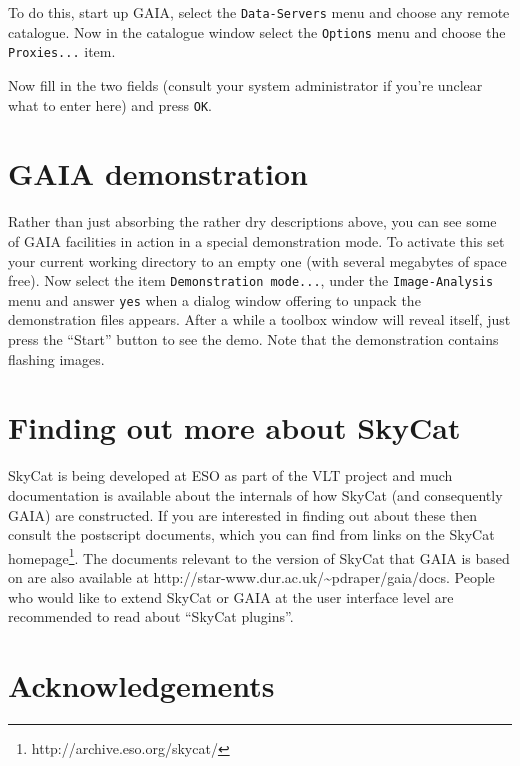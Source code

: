 \documentclass[twoside,11pt]{article}
\newcommand{\htmladdnormallinkfoot}[2]{#1\footnote{#2}}
\newcommand{\htmladdnormallink}[2]{#1}
\newcommand{\xlabel}[1]{}
\renewcommand{\_}{\texttt{\symbol{95}}}
\newcommand{\mytt}[1]{{\texttt{#1}}}
\begin{document}
To do this, start up GAIA, select the \mytt{Data-Servers} menu and
choose any remote catalogue. Now in the catalogue window select the
\mytt{Options} menu and choose the \mytt{Proxies...} item.

Now fill in the two fields (consult your system administrator if you're
unclear what to enter here) and press \mytt{OK}.

\section{\xlabel{gaia_demonstration}GAIA demonstration}
Rather than just absorbing the rather dry descriptions above, you can
see some of GAIA facilities in action in a special demonstration
mode. To activate this set your current working directory to an empty
one (with several megabytes of space free). Now select the item
\mytt{Demonstration mode...}, under the \mytt{Image-Analysis} menu and
answer \mytt{yes} when a dialog window offering to unpack the
demonstration files appears. After a while a toolbox window will
reveal itself, just press the ``Start'' button to see the demo. Note
that the demonstration contains flashing images.

\section{\xlabel{finding_out_more_about_skycat}Finding out more about SkyCat}
\htmladdnormallink{SkyCat}{http://archive.eso.org/skycat/} is being
developed at \htmladdnormallink{ESO}{http://www.eso.org/} as part of
the \htmladdnormallink{VLT}{http://www.eso.org/vlt/} project and much
documentation is available about the internals of how SkyCat (and
consequently GAIA) are constructed. If you are interested in finding
out about these then consult the postscript documents, which you can
find from links on the \htmladdnormallinkfoot{SkyCat
homepage}{http://archive.eso.org/skycat/}. The documents relevant to
the version of SkyCat that GAIA is based on are also available at
\htmladdnormallink{http://star-www.dur.ac.uk/\~{}pdraper/gaia/docs}
{http://star-www.dur.ac.uk/~pdraper/gaia/docs}. People who would like
to extend SkyCat or GAIA at the user interface level are recommended
to read about ``SkyCat plugins''.


\section{\xlabel{acknowledgements}Acknowledgements}
\end{document}
